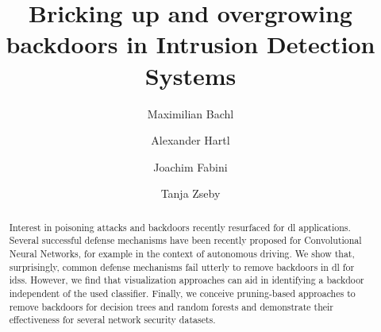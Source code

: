 \documentclass[10pt,sigconf,letterpaper,dvipsnames]{acmart}
\begin{document}
\title{Bricking up and overgrowing backdoors in Intrusion Detection Systems}



\begin{abstract}
Interest in poisoning attacks and backdoors recently resurfaced for \gls{dl} applications. Several successful defense mechanisms have been recently proposed for Convolutional Neural Networks, for example in the context of autonomous driving. We show that, surprisingly, common defense mechanisms fail utterly to remove backdoors in \gls{dl} for \glspl{ids}. However, we find that visualization approaches can aid in identifying a backdoor independent of the used classifier. Finally, we conceive pruning-based approaches to remove backdoors for decision trees and random forests and demonstrate their effectiveness for several network security datasets.
\end{abstract}

\author{Maximilian Bachl}

\author{Alexander Hartl}

\author{Joachim Fabini}

\author{Tanja Zseby}
\end{document}
